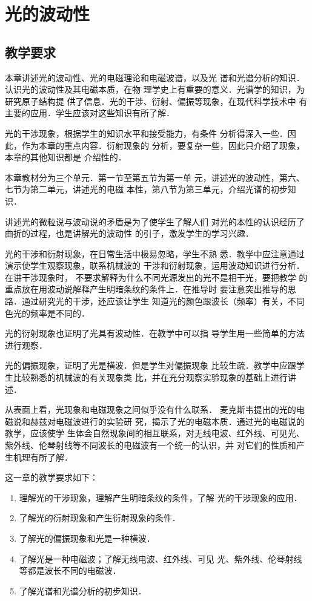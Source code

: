\chapter{光的波动性}\minitoc[n]
\section{教学要求}

本章讲述光的波动性、光的电磁理论和电磁波谱，以及光
谱和光谱分析的知识．认识光的波动性及其电磁本质，在物
理学史上有重要的意义．光谱学的知识，为研究原子结构提
供了信息．光的干涉、衍射、偏振等现象，在现代科学技术中
有主要的应用．学生应该对这些知识有所了解．

光的干涉现象，根据学生的知识水平和接受能力，有条件
分析得深入一些．因此，作为本章的重点内容．衍射现象的
分析，要复杂一些，因此只介绍了现象，本章的其他知识都是
介绍性的．

本章教材分为三个单元．第一节至第五节为第一单
元，讲述光的波动性，第六、七节为第二单元，讲述光的电磁
本性，第八节为第三单元，介绍光谱的初步知识．

讲述光的微粒说与波动说的矛盾是为了使学生了解人们
对光的本性的认识经历了曲折的过程，也是讲解光的波动性
的引子，激发学生的学习兴趣．

光的干涉和衍射现象，在日常生活中极易忽略，学生不熟
悉．教学中应注意通过演示使学生观察现象，联系机械波的
干涉和衍射现象，运用波动知识进行分析．在讲干涉现象时，
不要求解释为什么不同光源发出的光不是相干光，要把教学
的重点放在用波动说解释产生明暗条纹的条件上．在推导时
要注意突出推导的思路．通过研究光的干涉，还应该让学生
知道光的颜色跟波长（频率）有关，不同色光的频率是不同的．

光的衍射现象也证明了光具有波动性．在教学中可以指
导学生用一些简单的方法进行观察．

光的偏振现象，证明了光是横波．但是学生对偏振现象
比较生疏．教学中应跟学生比较熟悉的机械波的有关现象类
比，并在充分观察实验现象的基础上进行讲述．

从表面上看，光现象和电磁现象之间似乎没有什么联系．
麦克斯韦提出的光的电磁说和赫兹对电磁波进行的实验研
究，揭示了光的电磁本质．通过光的电磁说的教学，应该使学
生体会自然现象间的相互联系，对无线电波、红外线、可见光、
紫外线、伦琴射线等不同波长的电磁波有一个统一的认识，并
对它们的性质和产生机理有所了解．

这一章的教学要求如下：
\begin{enumerate}
\item 理解光的干涉现象，理解产生明暗条纹的条件，了解
光的干涉现象的应用．
\item 了解光的衍射现象和产生衍射现象的条件．
\item 了解光的偏振现象和光是一种横波．
\item 了解光是一种电磁波；了解无线电波、红外线、可见
光、紫外线、伦琴射线等都是波长不同的电磁波．
\item 了解光谱和光谱分析的初步知识．
\end{enumerate}

